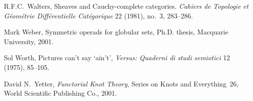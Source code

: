 \begin{thebibliography}{c9999}
R.F.C.~Walters,
Sheaves and Cauchy-complete categories.
\emph{Cahiers de Topologie et G\'eom\'etrie Diff\'erentielle Cat\'egorique} 
22 (1981), no.~3, 283--286.

Mark Weber, 
Symmetric operads for globular sets,
Ph.D. thesis, Macquarie University, 2001.

Sol Worth, 
Pictures can't say `ain't',
\emph{Versus: Quaderni di studi semiotici} 12 (1975), 85--105.

David N.~Yetter, 
\emph{Functorial Knot Theory},
Series on Knots and Everything~26,
World Scientific Publishing Co., 2001.



\end{thebibliography}

\normalsize